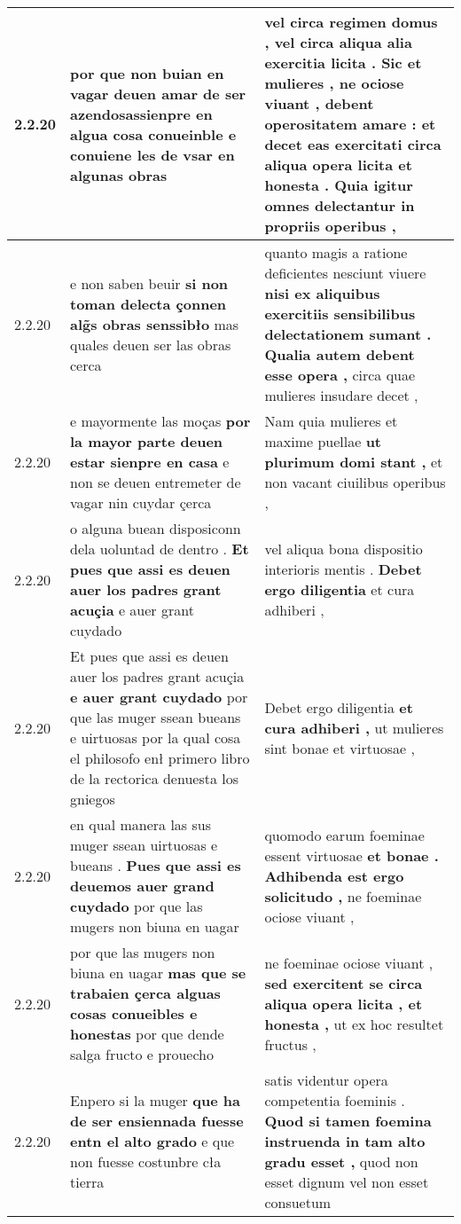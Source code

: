 \begin{tabular}{|p{1cm}|p{6.5cm}|p{6.5cm}|}
2.2.20 & por que non buian en vagar deuen amar \textbf{ de ser azendosassienpre en algua cosa conueinble } e conuiene les de vsar en algunas obras & vel circa regimen domus , vel circa aliqua alia exercitia licita . Sic et mulieres , \textbf{ ne ociose viuant , debent operositatem amare : et decet eas exercitati circa aliqua opera licita et honesta . } Quia igitur omnes delectantur in propriis operibus , \\\hline
2.2.20 & e non saben beuir \textbf{ si non toman delecta çonnen alg̃s obras senssibło } mas quales deuen ser las obras cerca & quanto magis a ratione deficientes nesciunt viuere \textbf{ nisi ex aliquibus exercitiis sensibilibus delectationem sumant . Qualia autem debent esse opera , } circa quae mulieres insudare decet , \\\hline
2.2.20 & e mayormente las moças \textbf{ por la mayor parte deuen estar sienpre en casa } e non se deuen entremeter de vagar nin cuydar çerca & Nam quia mulieres et maxime puellae \textbf{ ut plurimum domi stant , } et non vacant ciuilibus operibus , \\\hline
2.2.20 & o alguna buean disposiconn dela uoluntad de dentro . \textbf{ Et pues que assi es deuen auer los padres grant acuçia } e auer grant cuydado & vel aliqua bona dispositio interioris mentis . \textbf{ Debet ergo diligentia } et cura adhiberi , \\\hline
2.2.20 & Et pues que assi es deuen auer los padres grant acuçia \textbf{ e auer grant cuydado } por que las muger ssean bueans e uirtuosas por la qual cosa el philosofo enł primero libro de la rectorica denuesta los gniegos & Debet ergo diligentia \textbf{ et cura adhiberi , } ut mulieres sint bonae et virtuosae , \\\hline
2.2.20 & en qual manera las sus muger ssean uirtuosas e bueans . \textbf{ Pues que assi es deuemos auer grand cuydado } por que las mugers non biuna en uagar & quomodo earum foeminae essent virtuosae \textbf{ et bonae . Adhibenda est ergo solicitudo , } ne foeminae ociose viuant , \\\hline
2.2.20 & por que las mugers non biuna en uagar \textbf{ mas que se trabaien çerca alguas cosas conueibles e honestas } por que dende salga fructo e prouecho & ne foeminae ociose viuant , \textbf{ sed exercitent se circa aliqua opera licita , et honesta , } ut ex hoc resultet fructus , \\\hline
2.2.20 & Enpero si la muger \textbf{ que ha de ser ensiennada fuesse entn el alto grado } e que non fuesse costunbre cła tierra & satis videntur opera competentia foeminis . \textbf{ Quod si tamen foemina instruenda in tam alto gradu esset , } quod non esset dignum vel non esset consuetum \\\hline

\end{tabular}
